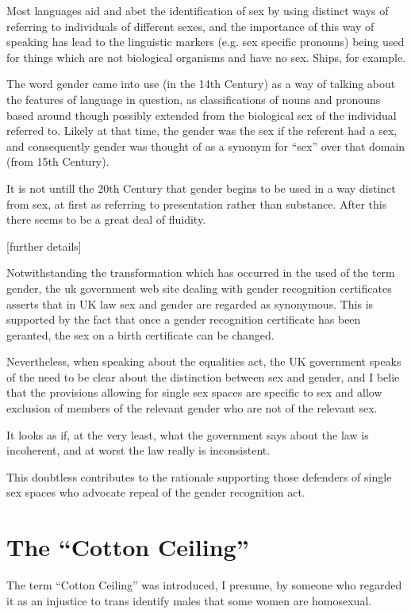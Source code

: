 \documentclass[10pt,titlepage]{book}
\begin{document}
Most languages aid and abet the identification of sex by using distinct ways of referring to individuals of different sexes, and the importance of this way of speaking has lead to the linguistic markers (e.g. sex specific pronouns) being used for things which are not biological organisms and have no sex.
Ships, for example.

The word gender came into use (in the 14th Century) as a way of talking about the features of language in question, as classifications of nouns and pronouns based around though possibly extended from the biological sex of the individual referred to.
Likely at that time, the gender was the sex if the referent had a sex, and consequently gender was thought of as a synonym for ``sex'' over that domain (from 15th Century).

It is not untill the 20th Century that gender begins to be used in a way distinct from sex, at first as referring to presentation rather than substance.
After this there seems to be a great deal of fluidity.

[further details]

Notwithstanding the transformation which has occurred in the used of the term gender, the uk government web site dealing with gender recognition certificates asserts that in UK law sex and gender are regarded as synonymous.
This is supported by the fact that once a gender recognition certificate has been geranted, the sex on a birth certificate can be changed.

Nevertheless, when speaking about the equalities act, the UK government speaks of the need to be clear about the distinction between sex and gender, and I belie that the provisions allowing for single sex spaces are specific to sex and allow exclusion of members of the relevant gender who are not of the relevant sex.

It looks as if, at the very least, what the government says about the law is incoherent, and at worst the law really is inconsistent.

This doubtless contributes to the rationale supporting those defenders of single sex spaces who advocate repeal of the gender recognition act.

\section{The ``Cotton Ceiling''}

The term ``Cotton Ceiling'' was introduced, I presume, by someone who regarded it as an injustice to trans identify males that some women are homosexual.
\end{document}
